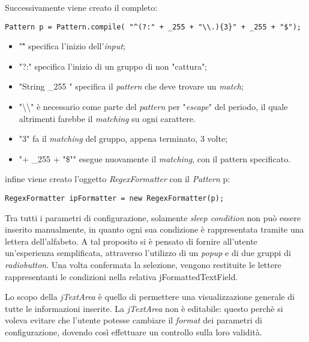 Successivamente viene creato il  completo:

\vspace{0.5cm}
\begin{lstlisting}
Pattern p = Pattern.compile( "^(?:" + _255 + "\\.){3}" + _255 + "$");
\end{lstlisting}

\begin{itemize}
	\item "\^"  specifica l'inizio dell'\textit{input};
	\item "?:" specifica l'inizio di un gruppo di non "cattura";
	\item "String \_255 " specifica il \textit{pattern} che deve trovare un \textit{match};
	\item "\textbackslash\textbackslash "  \`{e} necessario come parte del \textit{pattern} per "\textit{escape}" del periodo, il quale altrimenti farebbe il \textit{matching} su ogni carattere.
	\item "{3}" fa il \textit{matching} del gruppo, appena terminato, 3 volte; 
	\item "{{+ \_255 + "\$"}}" esegue nuovamente il \textit{matching}, con il pattern specificato.
\end{itemize}

infine viene creato l'oggetto \textit{RegexFormatter} con il \textit{Pattern} p:

\vspace{0.5cm}
\begin{lstlisting}
RegexFormatter ipFormatter = new RegexFormatter(p);
\end{lstlisting}

Tra tutti i parametri di configurazione, solamente \textit{sleep condition} non pu\`{o} essere inserito manualmente, in quanto ogni sua condizione \`{e} rappresentata tramite una lettera dell'alfabeto. A tal proposito si \`{e} pensato di fornire all'utente un'esperienza semplificata, attraverso l'utilizzo di un \textit{popup} e di due gruppi di \textit{radiobutton}. 
Una volta confermata la selezione, vengono restituite le lettere rappresentanti le condizioni nella relativa {jFormattedTextField}.

Lo scopo della \textit{jTextArea} \`{e} quello di permettere una visualizzazione generale di tutte le informazioni inserite. La \textit{jTextArea} non \`{e} editabile: questo perch\`{e} si voleva evitare che l'utente potesse cambiare il \textit{format} dei parametri di configurazione, dovendo cos\`{i} effettuare un controllo sulla loro validit\`{a}.

